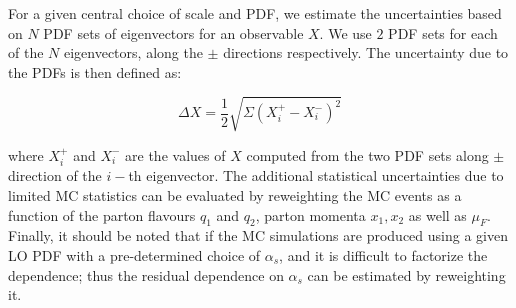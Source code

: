 For a given central choice of scale and PDF, we estimate the uncertainties 
based on $N$ PDF sets of eigenvectors for an observable $X$. We use $2$ PDF 
sets for each of the $N$ eigenvectors, along the $\pm$ directions respectively. 
The uncertainty due to the PDFs is then defined as:

\begin{equation}
	\Delta X = \frac{1}{2} \sqrt{\Sigma (X_i^+ - X_i^-)^2 }
\end{equation}

where $X_i^+$ and $X_i^-$ are the values of $X$ computed from the two PDF sets 
along $\pm$ direction of the $i-$th eigenvector. The additional statistical 
uncertainties due to limited MC statistics can be evaluated by reweighting the 
MC events as a function of the parton flavours $q_1$ and $q_2$, parton momenta 
$x_1, x_2$ as well as $\mu_F$. Finally, it should be noted that if the MC 
simulations are produced using a given LO PDF with a pre-determined choice of 
$\alpha_s$, and it is difficult to factorize the dependence; thus the residual 
dependence on $\alpha_s$ can be estimated by reweighting it.
